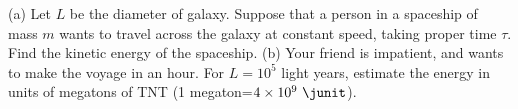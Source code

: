 (a) Let $L$ be the diameter of galaxy. Suppose that a person in a spaceship of mass $m$ wants
to travel across the galaxy at constant speed, taking proper time $\tau$. Find the kinetic
energy of the spaceship. (b) Your friend is impatient, and wants to make the voyage in
an hour. For $L=10^5$ light years, estimate the energy in units of megatons of TNT
(1 megaton=$4\times10^9\ \junit$).
